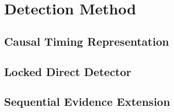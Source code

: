 \documentclass{vgtc}                          %
\begin{document}

\section{Detection Method}

\subsection{Causal Timing Representation}


\subsection{Locked Direct Detector}

\subsection{Sequential Evidence Extension}
%

\end{document}
